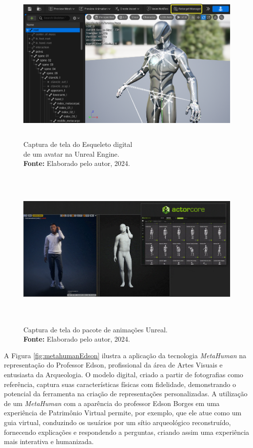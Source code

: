 {    \begin{figure}[H]
        \centering
        \includegraphics[height=8cm, keepaspectratio]{img/skeleton.png}
        \caption{Captura de tela do Esqueleto digital \\de um avatar na Unreal Engine.\\
            \textbf{Fonte:} Elaborado pelo autor, 2024.}
        \label{fig:skeleton}
    \end{figure}
    
    \begin{figure}[H]
        \centering
        \includegraphics[height=8cm, keepaspectratio]{gif/animacoes/feature_body_motion-0000.jpg}
        \caption{ Captura de tela do pacote de animações Unreal.\\
            \textbf{Fonte:} Elaborado pelo autor, 2024.}
        \label{fig:animacoes}
    \end{figure}
    
    
    A Figura \ref{fig:metahumanEdson} ilustra a aplicação da tecnologia \textit{MetaHuman} na representação do Professor Edson, profissional da área de Artes Visuais e entusiasta da Arqueologia. O modelo digital, criado a partir de fotografias como referência, captura suas características físicas com fidelidade, demonstrando o potencial da ferramenta na criação de representações personalizadas. A utilização de um \textit{MetaHuman} com a aparência do professor Edson Borges em uma experiência de Patrimônio Virtual permite, por exemplo, que ele atue como um guia virtual, conduzindo os usuários por um sítio arqueológico reconstruído, fornecendo explicações e respondendo a perguntas, criando assim uma experiência mais interativa e humanizada.
    
}
